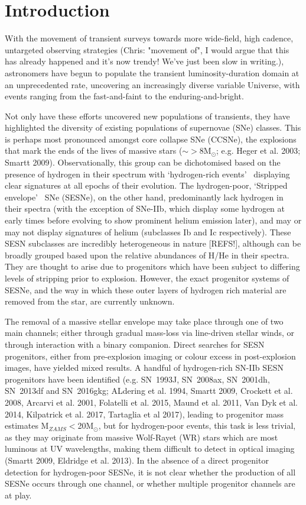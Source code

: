 \documentclass[a4paper,fleqn,usenatbib]{mnras}
\newcommand{\angus}[1]{\color{JungleGreen}#1\color{black}}
\newcommand{\chris}[1]{\color{orange}#1\color{black}}
\begin{document}
\section{Introduction}

With the movement of transient surveys towards more wide-field, high cadence, untargeted observing strategies \chris{(Chris: "movement of", I would argue that this has already happened and it's now trendy! We've just been slow in writing.)}, astronomers have begun to populate the transient luminosity-duration domain at an unprecedented rate, uncovering an increasingly diverse variable Universe, with events ranging from the fast-and-faint to the enduring-and-bright. 

Not only have these efforts uncovered new populations of transients, they have highlighted the diversity of existing populations of supernovae (SNe) classes. This is perhaps most pronounced amongst core collapse SNe (CCSNe), the explosions that mark the ends of the lives of massive stars ($\sim>$8M$_{\odot}$; e.g. {\angus{Heger et al. 2003; Smartt 2009}}). Observationally, this group can be dichotomised based on the presence of hydrogen in their spectrum with \lq hydrogen-rich events\rq~ displaying clear signatures at all epochs of their evolution. The hydrogen-poor, \lq Stripped envelope\rq~ SNe (SESNe), on the other hand, predominantly lack hydrogen in their spectra (with the exception of SNe-IIb, which display some hydrogen at early times before evolving to show prominent helium emission later), and may or may not display signatures of helium (subclasses Ib and Ic respectively). These SESN subclasses are incredibly heterogeneous in nature {\angus{[REFS!]}}, although can be broadly grouped based upon the relative abundances of H/He in their spectra. They are thought to arise due to progenitors which have been subject to differing levels of stripping prior to explosion. However, the exact progenitor systems of SESNe, and the way in which these outer layers of hydrogen rich material are removed from the star, are currently unknown. 

The removal of a massive stellar envelope may take place through one of two main channels; either through gradual mass-loss via line-driven stellar winds, or through interaction with a binary companion. Direct searches for SESN progenitors, either from pre-explosion imaging or colour excess in post-explosion images, have yielded mixed results. A handful of hydrogen-rich SN-IIb SESN progenitors have been identified {\angus
{(e.g. SN~1993J, SN~2008ax, SN~2001dh, SN~2013df and SN~2016gkg; ALdering et al. 1994, Smartt 2009, Crockett et al. 2008, Arcarvi et al. 2001, Folatelli et al. 2015, Maund et al. 2011, Van Dyk et al. 2014, Kilpatrick et al. 2017, Tartaglia et al 2017)}}, leading to progenitor mass estimates M$_{ZAMS}<$20M$_{\odot}$, but for hydrogen-poor events, this task is less trivial, as they may originate from massive Wolf-Rayet (WR) stars which are most luminous at UV wavelengths, making them difficult to detect in optical imaging {\angus{(Smartt 2009, Eldridge et al. 2013)}}. In the absence of a direct progenitor detection for hydrogen-poor SESNe, it is not clear whether the production of all SESNe occurs through one channel, or whether multiple progenitor channels are at play.
\end{document}

